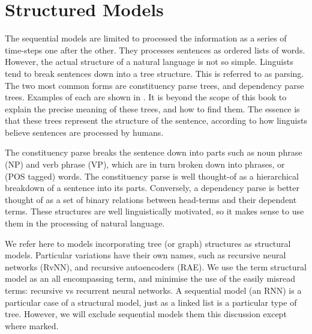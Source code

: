\documentclass[12pt,parskip]{komatufte}
\begin{document}
\section{Structured Models}

The sequential models are limited to processed the information as a series of time-steps one after the other.
They processes sentences as ordered lists of words.
However, the actual structure of a natural language is not so simple.
Linguists tend to break sentences down into a tree structure.
This is referred to as parsing.
The two most common forms are constituency parse trees, and dependency parse trees.
Examples of each are shown in .
It is beyond the scope of this book to explain the precise meaning of these trees, and how to find them.
The essence is that these trees represent the structure of the sentence,
according to how linguists believe sentences are processed by humans.


The constituency parse breaks the sentence down into parts such as noun phrase (NP) and verb phrase (VP),
which are in turn broken down into phrases, or (POS tagged) words.
The constituency parse is well thought-of as a hierarchical breakdown of a sentence into its parts.
Conversely, a dependency parse is better thought of as a set of binary relations between head-terms and their dependent terms.
These structures are well linguistically motivated, so it makes sense to use them in the processing of natural language.




We refer here to models incorporating tree (or graph) structures as structural models.
Particular variations have their own names, such as recursive neural networks (RvNN), and recursive autoencoders (RAE).
We use the term structural model as an all encompassing term,
and minimise the use of the easily misread terms: recursive vs recurrent  neural networks.
A sequential model  (an RNN) is a particular case of a structural model, just as a linked list is a particular type of tree.
However, we will exclude sequential models them this discussion except where marked.
\end{document}
